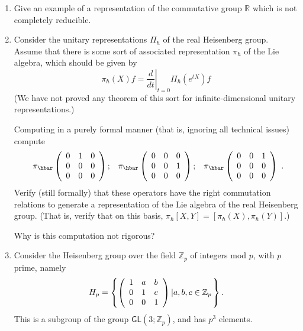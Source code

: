 \documentclass{amsbook}
\theoremstyle{plain}
\numberwithin{equation}{chapter}
\numberwithin{theorem}{chapter}
\begin{document}
\begin{enumerate}
\item  Give an example of a representation of the commutative group
$\mathbb{R}$ which is not completely reducible.

\item \label{ccr}Consider the unitary representations $\Pi_{\hbar}$ of the
real Heisenberg group. Assume that there is some sort of associated
representation $\pi_{\hbar}$ of the Lie algebra, which should be given by
\[
\pi_{\hbar}(X)f=\left.  \frac{d}{dt}\right|  _{t=0}\Pi_{\hbar}\left(
e^{tX}\right)  f
\]
(We have not proved any theorem of this sort for infinite-dimensional unitary representations.)

Computing in a purely formal manner (that is, ignoring all technical issues)
compute
\[%
\begin{array}
[c]{ccc}%
\pi_{\hbar}\left(
\begin{array}
[c]{ccc}%
0 & 1 & 0\\
0 & 0 & 0\\
0 & 0 & 0
\end{array}
\right)  ; & \pi_{\hbar}\left(
\begin{array}
[c]{ccc}%
0 & 0 & 0\\
0 & 0 & 1\\
0 & 0 & 0
\end{array}
\right)  ; & \pi_{\hbar}\left(
\begin{array}
[c]{ccc}%
0 & 0 & 1\\
0 & 0 & 0\\
0 & 0 & 0
\end{array}
\right)
\end{array}
\text{.}%
\]
Verify (still formally) that these operators have the right commutation
relations to generate a representation of the Lie algebra of the real
Heisenberg group. (That is, verify that on this basis, $\pi_{\hbar}%
[X,Y]=[\pi_{\hbar}(X),\pi_{\hbar}(Y)]$.)

Why is this computation not rigorous?

\item \label{heisenberg.p}Consider the Heisenberg group over the field
$\mathbb{Z}_{p}$ of integers mod $p$, with $p$ prime, namely
\[
H_{p}=\left\{  \left(
\begin{array}
[c]{lll}%
1 & a & b\\
0 & 1 & c\\
0 & 0 & 1
\end{array}
\right)  \left|  a,b,c\in\mathbb{Z}_{p}\right.  \right\}  \text{.}%
\]
This is a subgroup of the group $\mathsf{GL}\left(  3;\mathbb{Z}_{p}\right)
$, and has $p^{3}$ elements.


\end{enumerate}
\end{document}
